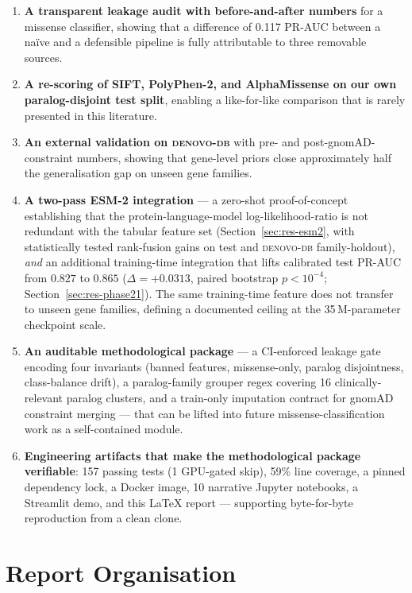 \documentclass[11pt,a4paper,oneside]{report}
\begin{document}
\begin{enumerate}
\item \textbf{A transparent leakage audit with before-and-after
numbers} for a missense classifier, showing that a
difference of 0.117 PR-AUC between a na\"ive and a
defensible pipeline is fully attributable to three
removable sources.
\item \textbf{A re-scoring of SIFT, PolyPhen-2, and
AlphaMissense on our own paralog-disjoint test split},
enabling a like-for-like comparison that is rarely
presented in this literature.
\item \textbf{An external validation on \textsc{denovo-db}}
with pre- and post-gnomAD-constraint numbers, showing
that gene-level priors close approximately half the
generalisation gap on unseen gene families.
\item \textbf{A two-pass ESM-2 integration} --- a
zero-shot proof-of-concept establishing that the
protein-language-model log-likelihood-ratio is not
redundant with the tabular feature set
(Section~\ref{sec:res-esm2}, with statistically tested
rank-fusion gains on test and \textsc{denovo-db}
family-holdout), \emph{and} an additional training-time
integration that lifts calibrated test PR-AUC from
$0.827$ to $0.865$ ($\Delta=+0.0313$, paired bootstrap
$p<10^{-4}$; Section~\ref{sec:res-phase21}). The same
training-time feature does not transfer to unseen gene
families, defining a documented ceiling at the
35\,M-parameter checkpoint scale.
\item \textbf{An auditable methodological package} --- a
CI-enforced leakage gate encoding four invariants
(banned features, missense-only, paralog disjointness,
class-balance drift), a paralog-family grouper regex
covering 16 clinically-relevant paralog clusters, and a
train-only imputation contract for gnomAD constraint
merging --- that can be lifted into future
missense-classification work as a self-contained module.
\item \textbf{Engineering artifacts that make the
methodological package verifiable}: 157 passing tests
(1 GPU-gated skip), 59\% line coverage, a pinned
dependency lock, a Docker image, 10 narrative Jupyter
notebooks, a Streamlit demo, and this LaTeX report ---
supporting byte-for-byte reproduction from a clean
clone.
\end{enumerate}

\section{Report Organisation}
\label{sec:intro-org}
\end{document}
